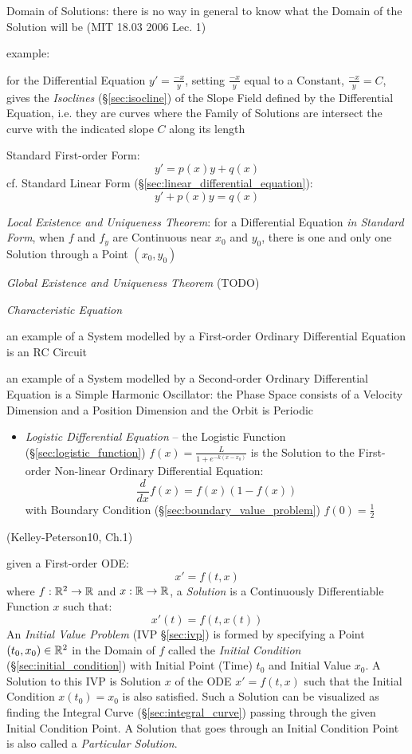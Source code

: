 {Domain of Solutions: there is no way in general to know what the Domain of the
Solution will be (MIT 18.03 2006 Lec. 1)

example:

for the Differential Equation $y' = \frac{-x}{y}$, setting $\frac{-x}{y}$ equal
to a Constant, $\frac{-x}{y} = C$, gives the \emph{Isoclines}
(\S\ref{sec:isocline}) of the Slope Field defined by the Differential Equation,
i.e. they are curves where the Family of Solutions are intersect the
curve with the indicated slope $C$ along its length

Standard First-order Form:
\[
  y' = p(x) y + q(x)
\]
cf. Standard Linear Form (\S\ref{sec:linear_differential_equation}):
\[
  y' + p(x) y = q(x)
\]

\emph{Local Existence and Uniqueness Theorem}: for a Differential Equation
\emph{in Standard Form}, when $f$ and $f_y$ are Continuous near $x_0$ and
$y_0$, there is one and only one Solution through a Point $(x_0, y_0)$

\emph{Global Existence and Uniqueness Theorem} (TODO)


\emph{Characteristic Equation}

an example of a System modelled by a First-order Ordinary Differential Equation
is an RC Circuit

an example of a System modelled by a Second-order Ordinary Differential
Equation is a Simple Harmonic Oscillator: the Phase Space consists of a
Velocity Dimension and a Position Dimension and the Orbit is Periodic

\asterism

\begin{itemize}
  \item \emph{Logistic Differential Equation} -- the Logistic Function
    (\S\ref{sec:logistic_function}) $f(x) = \frac{L}{1 + e^{-k(x-x_0)}}$ is the
    Solution to the First-order Non-linear Ordinary Differential Equation:
  \[
    \frac{d}{dx}f(x) = f(x)(1 - f(x))
  \]
  with Boundary Condition (\S\ref{sec:boundary_value_problem}) $f(0) =
  \frac{1}{2}$
\end{itemize}

\asterism

(Kelley-Peterson10, Ch.1)

given a First-order ODE:
\[
  x' = f(t,x)
\]
where $f : \mathbb{R}^2 \rightarrow \mathbb{R}$ and $x : \mathbb{R} \rightarrow \mathbb{R}$, a
\emph{Solution} is a Continuously Differentiable Function $x$ such that:
\[
  x'(t) = f(t, x(t))
\]
An \emph{Initial Value Problem} (IVP \S\ref{sec:ivp}) is formed by specifying a
Point $(t_0, x_0) \in \mathbb{R}^2$ in the Domain of $f$ called the \emph{Initial
  Condition} (\S\ref{sec:initial_condition}) with Initial Point (Time) $t_0$ and
Initial Value $x_0$.
A Solution to this IVP is Solution $x$ of the ODE $x' = f(t,x)$ such that the
Initial Condition $x(t_0) = x_0$ is also satisfied. Such a Solution can be
visualized as finding the Integral Curve (\S\ref{sec:integral_curve}) passing
through the given Initial Condition Point.
A Solution that goes through an Initial Condition Point is also called a
\emph{Particular Solution}.

}
